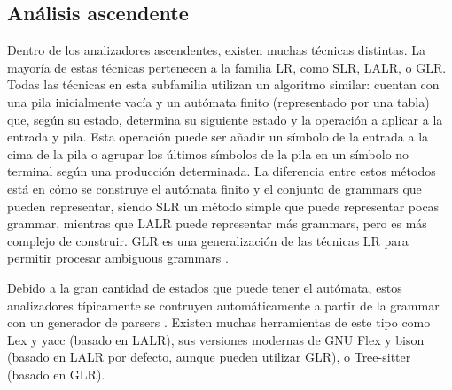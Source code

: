 \subsection{Análisis ascendente}

Dentro de los analizadores ascendentes, existen muchas técnicas distintas. La
mayoría de estas técnicas pertenecen a la familia LR, como SLR, LALR, o GLR.
Todas las técnicas en esta subfamilia utilizan un algoritmo similar: cuentan con
una pila inicialmente vacía y un autómata finito (representado por una tabla)
que, según su estado, determina su siguiente estado y la operación a aplicar a
la entrada y pila. Esta operación puede ser añadir un símbolo de la entrada a la
cima de la pila o agrupar los últimos símbolos de la pila en un símbolo no
terminal según una producción determinada. La diferencia entre estos métodos
está en cómo se construye el autómata finito y el conjunto de \glspl{grammar}
que pueden representar, siendo SLR un método simple que puede representar pocas
\gls{grammar}, mientras que LALR puede representar más \glspl{grammar}, pero es
más complejo de construir. \parencite{dragon-book} GLR es una generalización de
las técnicas LR para permitir procesar \glspl{ambiguous grammar}
\parencite{GLR-algorithm}.

Debido a la gran cantidad de estados que puede tener el autómata, estos
analizadores típicamente se contruyen automáticamente a partir de la
\gls{grammar} con un generador de \glspl{parser} \parencite{dragon-book}.
Existen muchas herramientas de este tipo como Lex y yacc \parencite{yacc}
(basado en LALR), sus versiones modernas de GNU Flex y bison \parencite{bison}
(basado en LALR por defecto, aunque pueden utilizar GLR), o Tree-sitter
\parencite{tree-sitter} (basado en GLR).
